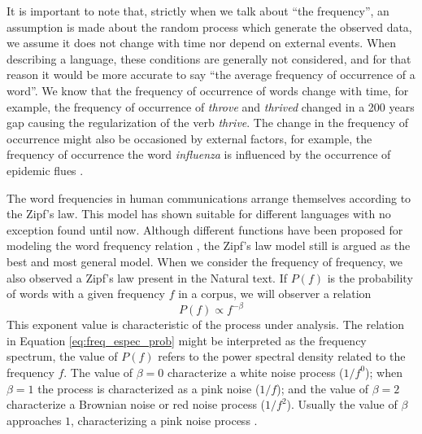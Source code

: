 It is important to note that, strictly when we talk about ``the frequency'', an assumption is made about
the random process which generate the observed data, we assume it does not change with time
nor depend on external events. When describing a language, these conditions are generally not considered,
and for that reason it would be more accurate to say ``the average frequency of occurrence of a word''.
We know that the frequency of occurrence of words change with time, for example, the frequency
of occurrence of \textit{throve} and \textit{thrived} changed in a 200 years gap causing the 
regularization of the verb \textit{thrive}. The change in the frequency of occurrence might also be
occasioned by external factors, for example, the frequency of occurrence the word \textit{influenza}
is influenced by the occurrence of epidemic flues \citep{baptiste2011}.





The word frequencies in human communications arrange themselves according to the Zipf's law.
This model has shown suitable for different languages \citep{naranan1996} with no exception found until now.
Although different functions have been proposed for modeling the word frequency relation \citep{tuldava1996},
the Zipf's law model still is argued as the best and most general model.
When we consider the frequency of frequency, we also observed a Zipf's law present in the Natural text.
If $P(f)$ is the probability of words with a given frequency $f$ in a corpus, we will observer a relation
\begin{equation}
\label{eq:freq_espec_prob}
P(f) \propto f^{-\beta}
\end{equation}
This exponent value is characteristic of the process under analysis. 
The relation in Equation \ref{eq:freq_espec_prob} might be interpreted as the frequency spectrum,
the value of $P(f)$ refers to the power spectral density related to the frequency $f$.
The value of $\beta=0$ characterize a white noise process ($1/f^0$); when $\beta=1$ the process is
characterized as a pink noise ($1/f$); and the value of  $\beta=2$ characterize a Brownian noise
or red noise process ($1/f^2$). Usually the value of $\beta$ approaches $1$, characterizing
a pink noise process \citep{mandelbrot1999}.

